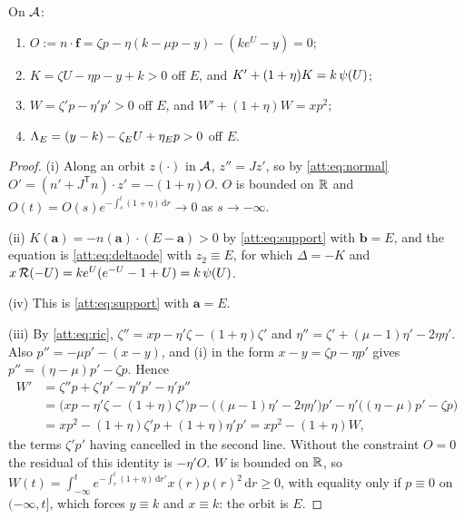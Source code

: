 \begin{lemma}\label{att:lem:gauges}
On $\mathcal A$:
\begin{enumerate}[label=\textup{(\roman*)}]
\item $O:=n\cdot\mathbf f=\zeta p-\eta(k-\mu p-y)-(ke^{U}-y)=0$;
\item $K=\zeta U-\eta p-y+k>0$ off $E$, and $K'+(1+\eta)K=k\,\psi(U)$;
\item $W=\zeta'p-\eta'p'>0$ off $E$, and $W'+(1+\eta)W=xp^2$;
\item $\Lambda_E=(y-k)-\zeta_EU+\eta_Ep>0$ off $E$.
\end{enumerate}
\end{lemma}
\begin{proof}
(i) Along an orbit $z(\cdot)$ in $\mathcal A$, $z''=Jz'$, so by \eqref{att:eq:normal} $O'=(n'+J^{\mathsf T}n)\cdot z'=-(1+\eta)O$. $O$ is bounded on $\mathbb R$ and $O(t)=O(s)e^{-\int_s^t(1+\eta)\,\mathrm dr}\to0$ as $s\to-\infty$.

(ii) $K(\mathbf a)=-n(\mathbf a)\cdot(E-\mathbf a)>0$ by \eqref{att:eq:support} with $\mathbf b=E$, and the equation is \eqref{att:eq:deltaode} with $z_2\equiv E$, for which $\Delta=-K$ and $x\,\mathcal R(-U)=ke^{U}(e^{-U}-1+U)=k\,\psi(U)$.

(iv) This is \eqref{att:eq:support} with $\mathbf a=E$.

(iii) By \eqref{att:eq:ric}, $\zeta''=xp-\eta'\zeta-(1+\eta)\zeta'$ and $\eta''=\zeta'+(\mu-1)\eta'-2\eta\eta'$. Also $p''=-\mu p'-(x-y)$, and (i) in the form $x-y=\zeta p-\eta p'$ gives $p''=(\eta-\mu)p'-\zeta p$. Hence
\begin{align*}
W'&=\zeta''p+\zeta'p'-\eta''p'-\eta'p''\\
&=\bigl(xp-\eta'\zeta-(1+\eta)\zeta'\bigr)p-\bigl((\mu-1)\eta'-2\eta\eta'\bigr)p'-\eta'\bigl((\eta-\mu)p'-\zeta p\bigr)\\
&=xp^2-(1+\eta)\zeta'p+(1+\eta)\eta'p'=xp^2-(1+\eta)W ,
\end{align*}
the terms $\zeta'p'$ having cancelled in the second line. Without the constraint $O=0$ the residual of this identity is $-\eta'O$. $W$ is bounded on $\mathbb R$, so $W(t)=\int_{-\infty}^te^{-\int_r^t(1+\eta)\,\mathrm dr'}x(r)p(r)^2\,\mathrm dr\ge0$, with equality only if $p\equiv0$ on $(-\infty,t]$, which forces $y\equiv k$ and $x\equiv k$: the orbit is $E$.
\end{proof}


